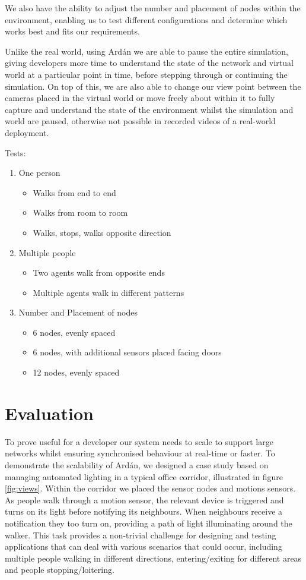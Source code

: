 We also have the ability to adjust the number and placement of nodes within the environment, enabling us to test different configurations and determine which works best and fits our requirements.

Unlike the real world, using Ard\'{a}n we are able to pause the entire simulation, giving developers more time to understand the state of the network and virtual world at a particular point in time, before stepping through or continuing the simulation. On top of this, we are also able to change our view point between the cameras placed in the virtual world or move freely about within it to fully capture and understand the state of the environment whilst the simulation and world are paused, otherwise not possible in recorded videos of a real-world deployment.

Tests:
\begin{enumerate}
  \item One person
    \begin{itemize}
      \item Walks from end to end
      \item Walks from room to room
      \item Walks, stops, walks opposite direction
    \end{itemize}
  \item Multiple people
  \begin{itemize}
    \item Two agents walk from opposite ends
    \item Multiple agents walk in different patterns
  \end{itemize}
  \item Number and Placement of nodes
  \begin{itemize}
    \item 6 nodes, evenly spaced
    \item 6 nodes, with additional sensors placed facing doors
    \item 12 nodes, evenly spaced
  \end{itemize}
\end{enumerate}



\section{Evaluation}
To prove useful for a developer our system needs to scale to support large networks whilst ensuring synchronised behaviour at real-time or faster. To demonstrate the scalability of Ard\'{a}n, we designed a case study based on managing automated lighting in a typical office corridor, illustrated in figure \ref{fig:views}. Within the corridor we placed the sensor nodes and motions sensors. As people walk through a motion sensor, the relevant device is triggered and turns on its light before notifying its neighbours. When neighbours receive a notification they too turn on, providing a path of light illuminating around the walker. This task provides a non-trivial challenge for designing and testing applications that can deal with various scenarios that could occur, including multiple people walking in different directions, entering/exiting for different areas and people stopping/loitering.

